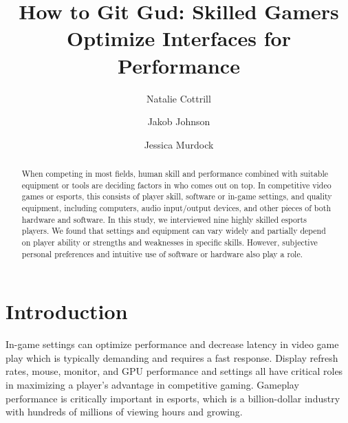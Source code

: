 \documentclass[sigconf]{acmart}
\begin{document}
\title{How to Git Gud: Skilled Gamers Optimize Interfaces for Performance}

\author{Natalie Cottrill}

\author{Jakob Johnson}

\author{Jessica Murdock}

\begin{abstract}
When competing in most fields, human skill and performance combined with suitable equipment or tools are deciding factors in who comes out on top. In competitive video games or esports, this consists of player skill, software or in-game settings, and quality equipment, including computers, audio input/output devices, and other pieces of both hardware and software. In this study, we interviewed nine highly skilled esports players. We found that settings and equipment can vary widely and partially depend on player ability or strengths and weaknesses in specific skills. However, subjective personal preferences and intuitive use of software or hardware also play a role.
\end{abstract}


\maketitle

\section{Introduction}
In-game settings can optimize performance and decrease latency in video game play \cite{Liu2021} which is typically demanding and requires a fast response. Display refresh rates, mouse, monitor, and GPU performance and settings all have critical roles in maximizing a player's advantage in competitive gaming. Gameplay performance is critically important in esports, which is a billion-dollar industry \cite{ayles2019} with hundreds of millions of viewing hours and growing. 
\end{document}
